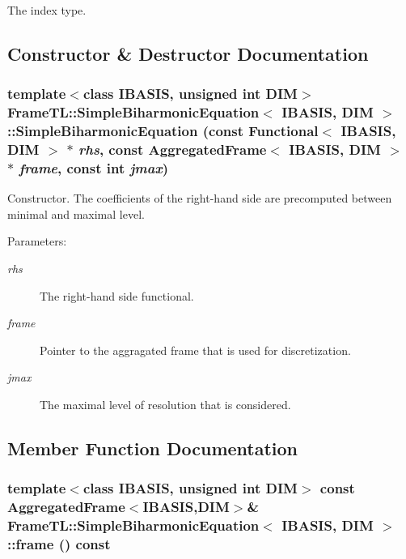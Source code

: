 The index type. 

\subsection{Constructor \& Destructor Documentation}
\hypertarget{classFrameTL_1_1SimpleBiharmonicEquation_ef39e6a2ad2a5ba99862edf485ea0466}{
\subsubsection[SimpleBiharmonicEquation]{\setlength{\rightskip}{0pt plus 5cm}template$<$class IBASIS, unsigned int DIM$>$ {\bf FrameTL::SimpleBiharmonicEquation}$<$ IBASIS, DIM $>$::{\bf SimpleBiharmonicEquation} (const {\bf Functional}$<$ IBASIS, DIM $>$ $\ast$ {\em rhs}, \/  const {\bf AggregatedFrame}$<$ IBASIS, DIM $>$ $\ast$ {\em frame}, \/  const int {\em jmax})}}
\label{classFrameTL_1_1SimpleBiharmonicEquation_ef39e6a2ad2a5ba99862edf485ea0466}


Constructor. The coefficients of the right-hand side are precomputed between minimal and maximal level.

\begin{Desc}
\item[Parameters:]
\begin{description}
\item[{\em rhs}]The right-hand side functional. \item[{\em frame}]Pointer to the aggragated frame that is used for discretization. \item[{\em jmax}]The maximal level of resolution that is considered. \end{description}
\end{Desc}


\subsection{Member Function Documentation}
\hypertarget{classFrameTL_1_1SimpleBiharmonicEquation_bc2645843910a5f7021eba52f5f6c017}{
\subsubsection[frame]{\setlength{\rightskip}{0pt plus 5cm}template$<$class IBASIS, unsigned int DIM$>$ const {\bf AggregatedFrame}$<$IBASIS,DIM$>$\& {\bf FrameTL::SimpleBiharmonicEquation}$<$ IBASIS, DIM $>$::frame () const}}
\label{classFrameTL_1_1SimpleBiharmonicEquation_bc2645843910a5f7021eba52f5f6c017}


